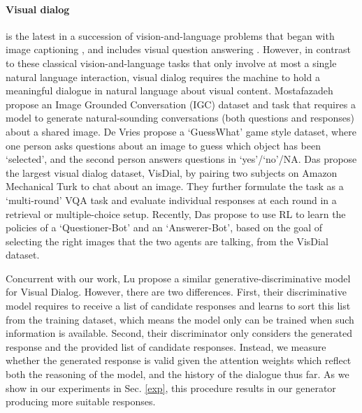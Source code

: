 \documentclass[10pt,twocolumn,letterpaper]{article}
\begin{document}
\paragraph{Visual dialog}
is the latest in a succession of vision-and-language problems that began with image captioning \cite{Karpathy2014deepvs,vinyals2014show,wu2015image}, and includes visual question answering \cite{antol2015vqa,ren2015image,wu2015ask}. However, in contrast to these classical vision-and-language tasks that only involve at most a single natural language interaction, visual dialog requires the machine to hold a meaningful dialogue in natural language about visual content. Mostafazadeh \etal \cite{mostafazadeh2017image} propose an Image Grounded Conversation (IGC) dataset and task that requires a model to generate natural-sounding conversations (both questions and responses) about a shared image.  De Vries \etal \cite{de2016guesswhat} propose a ‘GuessWhat’ game style dataset, where one person asks questions about an image to guess which object has been ‘selected’, and the second person answers questions in ‘yes’/‘no’/NA. Das \etal \cite{das2016visual} propose the largest visual dialog dataset, VisDial, by pairing two subjects on Amazon Mechanical Turk to chat about an image. They further formulate the task as a `multi-round' VQA task and evaluate individual responses at each round in a retrieval or multiple-choice setup. Recently, Das \etal \cite{das2017learning} propose to use RL to learn the policies of a `Questioner-Bot' and an `Answerer-Bot', based on the goal of selecting the right images that the two agents are talking, from the VisDial dataset. 

Concurrent with our work, Lu \etal \cite{lu2017best} propose a similar generative-discriminative model for Visual Dialog. However, there are two differences. First, their discriminative model requires to receive a list of candidate responses and learns to sort this list from the training dataset, which means the model only can be trained when such information is available.
Second, their discriminator only considers the generated response and the provided list of candidate responses. Instead, we measure whether the generated response is 
valid given the attention weights which reflect both the reasoning of the model, and the history of the dialogue thus far.
As we show in our experiments in Sec. \ref{exp}, this procedure results in our generator producing more suitable responses.

\vspace{-10pt}
\end{document}

